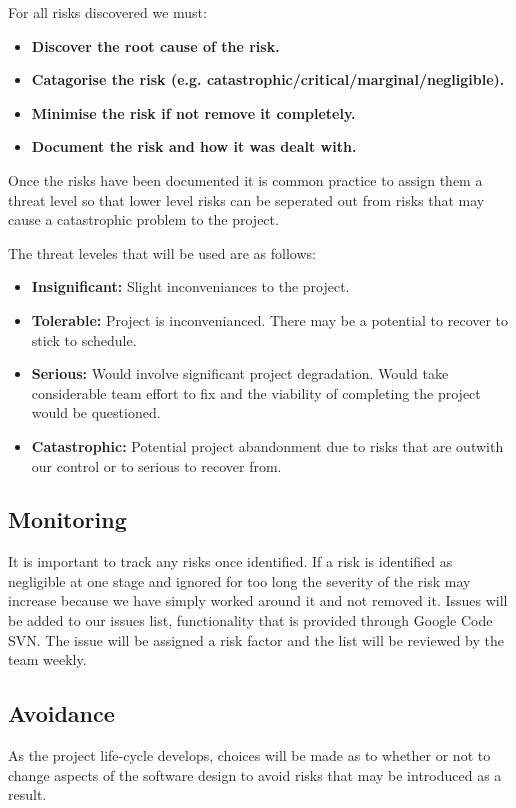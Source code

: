 \documentclass{l3proj}
\begin{document}
For all risks discovered we must:
\begin{itemize}
\item{\textbf{Discover the root cause of the risk.}}
\item{\textbf{Catagorise the risk (e.g. catastrophic/critical/marginal/negligible).}}
\item{\textbf{Minimise the risk if not remove it completely.}}
\item{\textbf{Document the risk and how it was dealt with.}}
\end{itemize}

Once the risks have been documented it is common practice to assign them a threat level so that lower level risks can be seperated out from risks that may cause a catastrophic problem to the project.

The threat leveles that will be used are as follows:
\begin{itemize}
\item{\textbf{Insignificant:} Slight inconveniances to the project.}
\item{\textbf{Tolerable:} Project is inconvenianced. There may be a potential to recover to stick to schedule.}
\item{\textbf{Serious:} Would involve significant project degradation. Would take considerable team effort to fix and the viability of completing the project would be questioned.}
\item{\textbf{Catastrophic:} Potential project abandonment due to risks that are outwith our control or to serious to recover from.}
\end{itemize}


\subsection{Monitoring}
It is important to track any risks once identified. If a risk is identified as negligible at one stage and ignored for too long the severity of the risk may increase because we have simply worked around it and not removed it. Issues will be added to our issues list, functionality that is provided through Google Code SVN. The issue will be assigned a risk factor and the list will be reviewed by the team weekly.

\subsection{Avoidance}
As the project life-cycle develops, choices will be made as to whether or not to change aspects of the software design to avoid risks that may be introduced as a result. 
\end{document}
